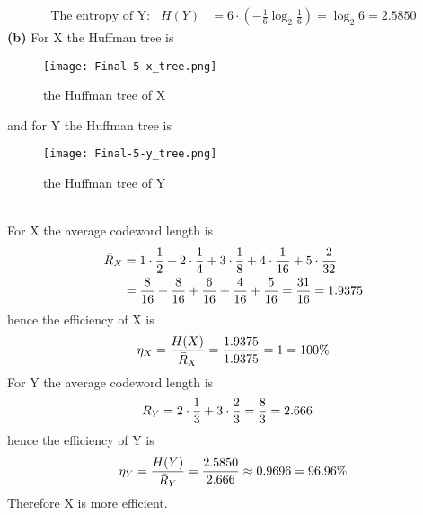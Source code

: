 \documentclass[a4paper,12pt]{article}
\begin{document}
\begin{enumerate}
\begin{align*}
                \text{The entropy of Y:} \;\;\; H(Y) &= 6 \cdot (- \frac{1}{6} \log_2 \frac{1}{6}) = \log_2 6 = 2.5850
            \end{align*}
            \textbf{(b)} For X the Huffman tree is
            \begin{figure}[h]
                \centering
                \texttt{[image: Final-5-x\_tree.png]}
                \caption{the Huffman tree of X}
            \end{figure}
            \newpage
            and for Y the Huffman tree is
            \begin{figure}[h]
                \centering
                \texttt{[image: Final-5-y\_tree.png]}
                \caption{the Huffman tree of Y}
            \end{figure} \\ 
            For X the average codeword length is
            \begin{align*}
                \Bar{R}_X &= 1 \cdot \frac{1}{2} + 2 \cdot \frac{1}{4} + 3 \cdot \frac{1}{8} + 4 \cdot \frac{1}{16} + 5 \cdot \frac{2}{32} \\
                        &= \frac{8}{16} + \frac{8}{16} + \frac{6}{16} + \frac{4}{16} + \frac{5}{16} = \frac{31}{16} = 1.9375
            \end{align*}
            hence the efficiency of X is
            \begin{align*}
                \eta_{X} = \frac{H(X)}{\Bar{R}_X} = \frac{1.9375}{1.9375} = 1 = 100 \%
            \end{align*}
            For Y the average codeword length is
            \begin{align*}
                \Bar{R}_Y &= 2 \cdot \frac{1}{3} + 3 \cdot \frac{2}{3} = \frac{8}{3} = 2.666
            \end{align*}
            hence the efficiency of Y is
            \begin{align*}
                \eta_{Y} = \frac{H(Y)}{\Bar{R}_Y} = \frac{2.5850}{2.666} \approx 0.9696 = 96.96 \%
            \end{align*}
            Therefore X is more efficient. \\ \\ 

\end{enumerate}
\end{document}
